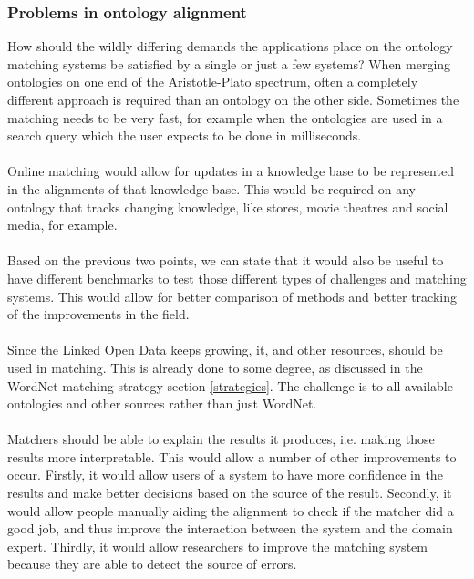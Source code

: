 \documentclass{article}
\begin{document}
 \subsubsection{Problems in ontology alignment}
 How should the wildly differing demands the applications place on the ontology matching systems be satisfied by a single or just a few systems? When merging ontologies on one end of the Aristotle-Plato spectrum, often a completely different approach is required than an ontology on the other side. Sometimes the matching needs to be very fast, for example when the ontologies are used in a search query which the user expects to be done in milliseconds.
 \paragraph{}
 Online matching would allow for updates in a knowledge base to be represented in the alignments of that knowledge base. This would be required on any ontology that tracks changing knowledge, like stores, movie theatres and social media, for example.
 \paragraph{}
 Based on the previous two points, we can state that it would also be useful to have different benchmarks to test those different types of challenges and matching systems. This would allow for better comparison of methods and better tracking of the improvements in the field.
 \paragraph{}
 Since the Linked Open Data keeps growing, it, and other resources, should be used in matching. This is already done to some degree, as discussed in the WordNet matching strategy section \ref{strategies}. The challenge is to all available ontologies and other sources rather than just WordNet.
 \paragraph{}
 Matchers should be able to explain the results it produces, i.e. making those results more interpretable. This would allow a number of other improvements to occur. Firstly, it would allow users of a system to have more confidence in the results and make better decisions based on the source of the result. Secondly, it would allow people manually aiding the alignment to check if the matcher did a good job, and thus improve the interaction between the system and the domain expert. Thirdly, it would allow researchers to improve the matching system because they are able to detect the source of errors.
\end{document}

